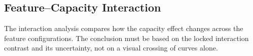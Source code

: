 \subsection{Feature--Capacity Interaction}
The interaction analysis compares how the capacity effect changes across the
feature configurations. The conclusion must be based on the locked interaction
contrast and its uncertainty, not on a visual crossing of curves alone.
